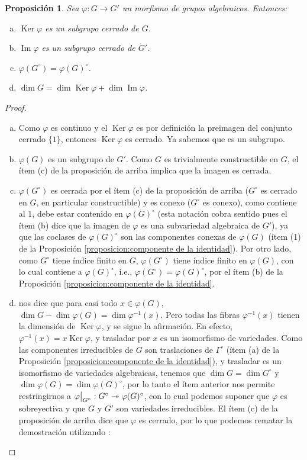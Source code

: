 \documentclass[spanish,10pt]{amsart}
\newcommand{\G}{\Gamma}
\newtheorem{proposition}[theorem]{Proposición}
\theoremstyle{definition}
\theoremstyle{remark}
\numberwithin{equation}{section}
\newcommand{\Imagen}{\operatorname{Im}}
\newcommand{\Ker}{\operatorname{Ker}}
\newcommand\rest[2]{{%
  \left.\kern-\nulldelimiterspace %
  #1 %
  \vphantom{\big|} %
  \right|_{#2} %
  }}
\begin{document}
\begin{proposition}\label{proposition:la imagen de un morfismo de grupos algebraicos es cerrado}
Sea $\varphi : G \to G'$ un morfismo de grupos algebraicos. Entonces:
\begin{enumerate}[(a)]
\item $\Ker \varphi$ es un subgrupo cerrado de $G$.
\item $\Imagen \varphi$ es un subgrupo cerrado de $G'$.
\item $\varphi (G^\circ) = \varphi (G)^\circ$.
\item $\dim G = \dim \Ker \varphi + \dim \Imagen \varphi$.
\end{enumerate}
\end{proposition}
\begin{proof}
\begin{enumerate}[(a)]
\item Como $\varphi$ es continuo y el $\Ker \varphi$ es por definición la preimagen del conjunto cerrado $\{1\}$, entonces $\Ker \varphi$ es cerrado. Ya sabemos que es un subgrupo.
\item $\varphi (G)$ es un subgrupo de $G'$. Como $G$ es trivialmente constructible en $G$, el ítem (c) de la proposición de arriba implica que la imagen es cerrada.
\item $\varphi (G^\circ)$ es cerrada por el ítem (c) de la proposición de arriba ($G^\circ$ es cerrado en $G$, en particular constructible) y es conexo ($G^\circ$ es conexo), como contiene al $1$, debe estar contenido en $\varphi (G)^\circ$ (esta notación cobra sentido pues el ítem (b) dice que la imagen de $\varphi$ es una subvariedad algebraica de $G'$), ya que las coclases de $\varphi (G)^\circ$ son las componentes conexas de $\varphi (G)$ (ítem (1) de la Proposición \ref{proposicion:componente de la identidad}). Por otro lado, como $G^\circ$ tiene índice finito en $G$, $\varphi (G^\circ)$ tiene índice finito en $\varphi (G)$, con lo cual contiene a $\varphi (G)^\circ$, i.e., $\varphi (G^\circ) = \varphi (G)^\circ$, por el ítem (b) de la Proposición \ref{proposicion:componente de la identidad}.
\item \cite[Ítem (2) del Teorema 2.12.9]{notas_pedro} nos dice que para casi todo $x \in \varphi (G)$, $\dim G - \dim \varphi (G) = \dim \varphi^{-1} (x)$. Pero todas las fibras $\varphi^{-1} (x)$ tienen la dimensión de $\Ker \varphi$, y se sigue la afirmación. En efecto, $\varphi^{-1} (x) = x \Ker \varphi $, y trasladar por $x$ es un isomorfismo de variedades. Como las componentes irreducibles de $G$ son traslaciones de $\G^\circ$ (ítem (a) de la Proposición \ref{proposicion:componente de la identidad}), y trasladar es un isomorfismo de variedades algebraicas, tenemos que $\dim G = \dim G^\circ$ y $\dim \varphi (G) = \dim \varphi (G)^\circ$, por lo tanto el ítem anterior nos permite restringirnos a $\rest \varphi {G^\circ} : G^\circ \twoheadrightarrow \varphi (G)^\circ$, con lo cual podemos suponer que $\varphi$ es sobreyectiva y que $G$ y $G'$ son variedades irreducibles. El ítem (c) de la proposición de arriba dice que $\varphi$ es cerrado, por lo que podemos rematar la demostración utilizando \cite[Teorema 2.12.13]{notas_pedro}:

\end{enumerate}
\end{proof}
\end{document}
